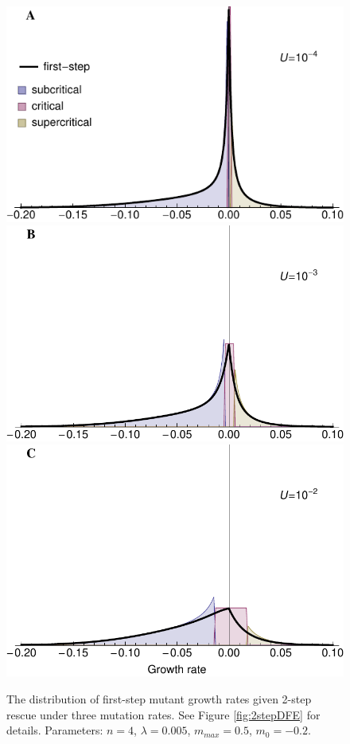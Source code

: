 \documentclass[9pt,twocolumn,twoside,lineno]{gsajnl}
\begin{document}
\begin{figure}[htbp]
\centering
\includegraphics[width=\linewidth]{../IMAGES/firststep_smallU.pdf}\\
\includegraphics[width=\linewidth]{../IMAGES/firststep_medU.pdf}\\
\includegraphics[width=\linewidth]{../IMAGES/firststep_largeU.pdf}
\caption{
The distribution of first-step mutant growth rates given 2-step rescue under three mutation rates. 
See Figure \ref{fig:2stepDFE} for details.
Parameters: $n=4$, $\lambda=0.005$, $m_{max}=0.5$, $m_0=-0.2$.
}%
\label{fig:firststepDFE_mutation}
\end{figure}
\end{document}
